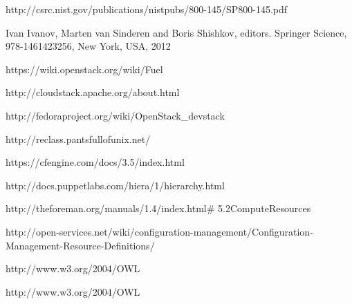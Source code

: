 


\newblock http://csrc.nist.gov/publications/nistpubs/800-145/SP800-145.pdf

Ivan Ivanov, Marten van Sinderen and Boris Shishkov, editors.
\newblock Springer Science, 978-1461423256, New York, USA, 2012

\newblock https://wiki.openstack.org/wiki/Fuel

\newblock http://cloudstack.apache.org/about.html

\newblock http://fedoraproject.org/wiki/OpenStack\_devstack

\newblock http://reclass.pantsfullofunix.net/

\newblock https://cfengine.com/docs/3.5/index.html

\newblock http://docs.puppetlabs.com/hiera/1/hierarchy.html

\newblock http://theforeman.org/manuals/1.4/index.html\# 5.2ComputeResources

\newblock http://open-services.net/wiki/configuration-management/Configuration-Management-Resource-Definitions/


\newblock http://www.w3.org/2004/OWL

\newblock http://www.w3.org/2004/OWL
